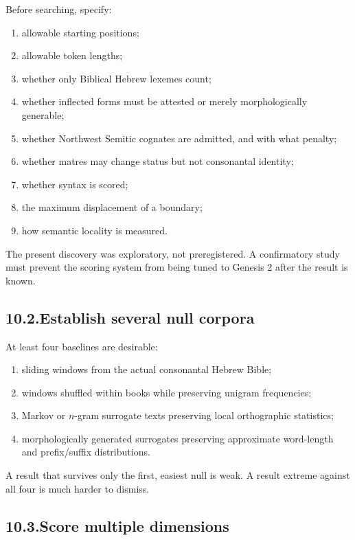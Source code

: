 Before searching, specify:

\begin{enumerate}
\item allowable starting positions;
\item allowable token lengths;
\item whether only Biblical Hebrew lexemes count;
\item whether inflected forms must be attested or merely morphologically generable;
\item whether Northwest Semitic cognates are admitted, and with what penalty;
\item whether matres may change status but not consonantal identity;
\item whether syntax is scored;
\item the maximum displacement of a boundary;
\item how semantic locality is measured.
\end{enumerate}

The present discovery was exploratory, not preregistered.  A confirmatory study must prevent the scoring system from being tuned to Genesis 2 after the result is known.

\subsection*{10.2.\quad Establish several null corpora}

At least four baselines are desirable:

\begin{enumerate}
\item sliding windows from the actual consonantal Hebrew Bible;
\item windows shuffled within books while preserving unigram frequencies;
\item Markov or $n$-gram surrogate texts preserving local orthographic statistics;
\item morphologically generated surrogates preserving approximate word-length and prefix/suffix distributions.
\end{enumerate}

A result that survives only the first, easiest null is weak.  A result extreme against all four is much harder to dismiss.

\subsection*{10.3.\quad Score multiple dimensions}

